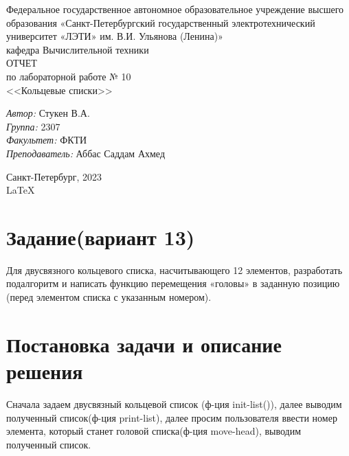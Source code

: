\documentclass[a4paper,12pt]{report}
\begin{document}
 

\begin{titlepage} 

\begin{center} 

\large Федеральное государственное автономное образовательное учреждение высшего образования «Санкт-Петербургский государственный электротехнический университет «ЛЭТИ» им. В.И. Ульянова (Ленина)»\\
кафедра Вычислительной техники\\[5cm] 

\huge ОТЧЕТ\\ по лабораторной работе № 10\\[0.5cm] 
\large <<Кольцевые списки>>\\[3.7cm]

\begin{minipage}{1\textwidth}
    \begin{flushleft}
        \emph{Автор:} Стукен В.А.\\
        \emph{Группа:} 2307\\
        \emph{Факультет:} ФКТИ\\
        \emph{Преподаватель:} Аббас Саддам Ахмед\\
    \end{flushleft}
\end{minipage}

\vfill

Санкт-Петербург, 2023\\
{\large \LaTeX}

\end{center}
\thispagestyle{empty}
\end{titlepage}

\section*{Задание(вариант 13)}
Для двусвязного кольцевого списка, насчитывающего 12 элементов, разработать подалгоритм и написать функцию перемещения «головы» в заданную позицию (перед элементом списка с указанным номером).
\section*{Постановка задачи и описание решения}
\par

Сначала задаем двусвязный кольцевой список (ф-ция init-list()), далее выводим полученный список(ф-ция print-list), далее просим пользователя ввести номер элемента, который станет головой списка(ф-ция move-head), выводим полученный список.
\end{document}
